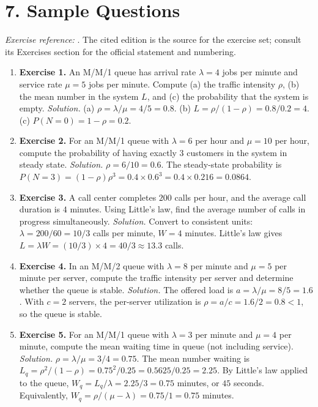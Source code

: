 \section*{7. Sample Questions}
\emph{Exercise reference:} \cite{queue_ref1}. The cited edition is the source for the exercise set; consult its Exercises section for the official statement and numbering.
\begin{enumerate}[leftmargin=*,itemsep=0.9em]
\item \textbf{Exercise 1.} An M/M/1 queue has arrival rate $\lambda=4$ jobs per minute and service rate $\mu=5$ jobs per minute. Compute (a) the traffic intensity $\rho$, (b) the mean number in the system $L$, and (c) the probability that the system is empty. \emph{Solution.} (a) $\rho=\lambda/\mu=4/5=0.8$. (b) $L=\rho/(1-\rho)=0.8/0.2=4$. (c) $P(N=0)=1-\rho=0.2$.

\item \textbf{Exercise 2.} For an M/M/1 queue with $\lambda=6$ per hour and $\mu=10$ per hour, compute the probability of having exactly $3$ customers in the system in steady state. \emph{Solution.} $\rho=6/10=0.6$. The steady-state probability is $P(N=3)=(1-\rho)\rho^3=0.4\times 0.6^3=0.4\times 0.216=0.0864$.

\item \textbf{Exercise 3.} A call center completes $200$ calls per hour, and the average call duration is $4$ minutes. Using Little's law, find the average number of calls in progress simultaneously. \emph{Solution.} Convert to consistent units: $\lambda=200/60=10/3$ calls per minute, $W=4$ minutes. Little's law gives $L=\lambda W=(10/3)\times 4=40/3\approx 13.3$ calls.

\item \textbf{Exercise 4.} In an M/M/2 queue with $\lambda=8$ per minute and $\mu=5$ per minute per server, compute the traffic intensity per server and determine whether the queue is stable. \emph{Solution.} The offered load is $a=\lambda/\mu=8/5=1.6$. With $c=2$ servers, the per-server utilization is $\rho=a/c=1.6/2=0.8<1$, so the queue is stable.

\item \textbf{Exercise 5.} For an M/M/1 queue with $\lambda=3$ per minute and $\mu=4$ per minute, compute the mean waiting time in queue (not including service). \emph{Solution.} $\rho=\lambda/\mu=3/4=0.75$. The mean number waiting is $L_q=\rho^2/(1-\rho)=0.75^2/0.25=0.5625/0.25=2.25$. By Little's law applied to the queue, $W_q=L_q/\lambda=2.25/3=0.75$ minutes, or $45$ seconds. Equivalently, $W_q=\rho/(\mu-\lambda)=0.75/1=0.75$ minutes.

\end{enumerate}
